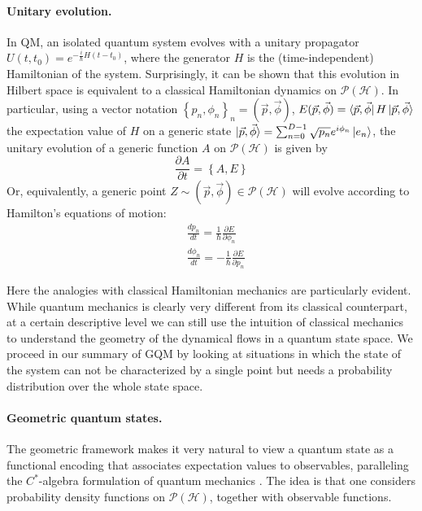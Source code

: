 \documentclass[draft,nofootinbib,pre,twocolumn,showpacs,showkeys,preprintnumbers,floatfix]{revtex4-1}
\newcommand{\1}{\mathbbm{1}}
\newcommand{\PH}{\mathcal{P}(\mathcal{H})}
\begin{document}
\paragraph*{Unitary evolution.} In QM, an isolated quantum system evolves
with a unitary propagator $U(t,t_0) = e^{-\frac{i}{\hbar}H (t-t_0)}$, where the
generator $H$ is the (time-independent) Hamiltonian of the system. Surprisingly, 
it can be shown \cite{Bengtsson2017} that this evolution in Hilbert space is equivalent to 
a classical Hamiltonian dynamics on $\PH$. In particular, using a vector notation $\left\{ p_n,\phi_n\right\}_n = (\vec{p},\vec{\phi})$, 
$E(\vec{p}, \vec{\phi}) = \bra{\vec{p},\vec{\phi}}H \ket{\vec{p},\vec{\phi}}$
the expectation value of $H$ on a generic state $\ket{\vec{p},\vec{\phi}} = \sum_{n=0}^{D-1}\sqrt{p_n}e^{i\phi_n}\ket{e_n}$, 
the unitary evolution of a generic function $A$ on $\PH$ is given by 
\begin{equation}
\frac{\partial A}{\partial t} = \left\{ A,E\right\}
\end{equation}
Or, equivalently, a generic point $Z \sim (\vec{p},\vec{\phi}) \in \PH$
will evolve according to Hamilton's equations of motion:
\begin{subequations}\label{eq:HAM_EOM}
\begin{align}
&\frac{dp_n}{dt} = \frac{1}{\hbar}\frac{\partial E}{\partial \phi_n} \\
&\frac{d\phi_n}{dt} = -\frac{1}{\hbar}\frac{\partial E}{\partial p_n} 
\end{align}
\end{subequations}

Here the analogies with classical Hamiltonian mechanics are particularly evident.
While quantum mechanics is clearly very different from its classical
counterpart, at a certain descriptive level we can still use the intuition
of classical mechanics to understand the geometry of the dynamical flows in a
quantum state space. We proceed in our summary of GQM by looking at situations 
in which the state of the system can not be characterized by a single point but needs 
a probability distribution over the whole state space.


\paragraph*{Geometric quantum states.}
The geometric framework makes it very natural to view a quantum state as a functional
encoding that associates expectation values to observables, paralleling the
$C^{*}$-algebra formulation of quantum mechanics \cite{Strocchi2008a}. 
The idea is that one considers probability density functions on $\mathcal{P}(\mathcal{H})$,
together with observable functions. 
\end{document}
